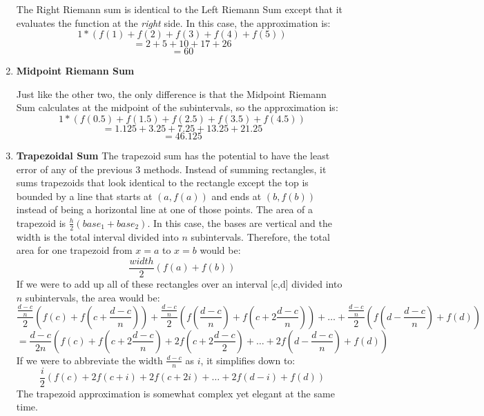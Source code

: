 \documentclass[../revisedmain.tex]{subfiles}
\begin{document}
\begin{enumerate}
\begin{center}
\begin{tikzpicture}
			\end{tikzpicture}
		\end{center}
		The Right Riemann sum is identical to the Left Riemann Sum except that it evaluates the function at the \textit{right} side. In this case, the approximation is:$$1*(f(1)+f(2)+f(3)+f(4)+f(5))$$$$=2+5+10+17+26$$$$=60$$
		\newpage
	\item \textbf{Midpoint Riemann Sum}
		\begin{center}
		\end{center}
		Just like the other two, the only difference is that the Midpoint Riemann Sum calculates at the midpoint of the subintervals, so the approximation is:$$1*(f(0.5)+f(1.5)+f(2.5)+f(3.5)+f(4.5))$$$$=1.125+3.25+7.25+13.25+21.25$$$$=46.125$$
	\newpage		
	\item \textbf{Trapezoidal Sum}
	The trapezoid sum has the potential to have the least error of any of the previous 3 methods. Instead of summing rectangles, it sums trapezoids that look identical to the rectangle except the top is bounded by a line that starts at $(a,f(a))$ and ends at $(b,f(b))$ instead of being a horizontal line at one of those points. The area of a trapezoid is $\displaystyle\frac{h}{2} (base_1+base_2)$. In this case, the bases are vertical and the width is the total interval divided into $n$ subintervals. Therefore, the total area for one trapezoid from $x=a$ to $x=b$ would be:$$\frac{width}{2} (f(a)+f(b))$$ If we were to add up all of these rectangles over an interval [c,d] divided into $n$ subintervals, the area would be:$$
	\frac{\frac{d-c}{n}}{2} \left(f(c)+f\left(c+\frac{d-c}{n}\right)\right)
	+\frac{\frac{d-c}{n}}{2} \left(f\left(\frac{d-c}{n}\right)+f\left(c+2\frac{d-c}{n}\right)\right)
	+\dots+\frac{\frac{d-c}{n}}{2} \left(f\left(d-\frac{d-c}{n}\right)+f(d)\right)$$$$
	=\frac{d-c}{2n}\left(f(c)+f\left(c+2\frac{d-c}{n}\right)+2f\left(c+2\frac{d-c}{2}\right)+\dots+2f\left(d-\frac{d-c}{n}\right)+f(d)\right)$$If we were to abbreviate the width $\displaystyle\frac{d-c}{n}$ as $i$, it simplifies down to:$$\frac{i}{2}\left(f(c)+2f(c+i)+2f(c+2i)+\dots+2f(d-i)+f(d)\right)$$The trapezoid approximation is somewhat complex yet elegant at the same time.
\end{enumerate}
\end{document}
